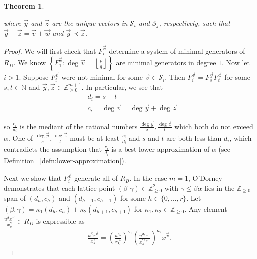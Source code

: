 \documentclass{amsart}
\theoremstyle{plain}
\newtheorem{thm}{Theorem}[section]
\theoremstyle{definition}
\theoremstyle{remark}
\numberwithin{equation}{section}
\newcommand\bn{{\mathbb N}}
\newcommand\bz{{\mathbb Z}}
\newcommand\mss{\mathscr{S}}
\begin{document}
\begin{thm}
\begin{enumerate}
\end{enumerate}

\noindent
where $\vec{y}$ and $\vec{z}$ are the unique
vectors in $\mss_i$ and $\mss_j$, respectively, such that $\vec{y}
+ \vec{z} = \vec{v} + \vec{w}$ and $\vec{y} \prec \vec{z}$.
\end{thm}
\begin{proof}
We will first check that $F^{\vec v}_i$ determine a system of minimal
generators of $R_D$. We know $\left\{F_{1}^{\vec{v}} : \deg \vec{v} =
\left\lfloor
\frac{p}{q} \right\rfloor \right\}$ are minimal generators in
degree $1$. Now let $i > 1$. Suppose $F_i^{\vec{v}}$ were not
minimal for some $\vec{v} \in \mss_i$. Then $F_i^{\vec{v}} =
F_{s}^{\vec{y}} F_{t}^{\vec{z}}$ for some $s, t \in \bn$ and
$\vec{y}, \vec{z} \in \bz_{ \geq 0}^{m + 1}$. In particular, we see
that 
\begin{align*}
	&d_i = s + t \\
	&c_i = \deg \vec{v} = \deg \vec{y} + \deg \vec{z}
\end{align*}

\noindent
so $\frac{c_i}{d_i}$ is the mediant of the rational numbers
$\frac{\deg \vec{y}}{s}, \frac{\deg \vec{z}}{t}$ which both
do not exceed $\alpha$. One of $\frac{\deg \vec{y}}{s},
\frac{\deg \vec{z}}{t}$ must be at least $\frac{c_i}{d_i}$
and $s$ and $t$ are both less than $d_i$, which contradicts the assumption that
$\frac{c_i}{d_i}$ is a best lower approximation of $\alpha$
(see Definition ~\ref{defn:lower-approximation}).

Next we show that $F^{\vec v}_i$ generate all of $R_D$. In the case $m = 1$, O'Dorney \cite[Theorem 6]
{dorney:canonical} demonstrates that each lattice point $(\beta, \gamma) \in
\bz_{\geq 0}^2$ with $\gamma \leq \beta \alpha$ lies in the $\bz_{\geq 0}$ span
of $(d_h, c_h)$ and $(d_{h + 1}, c_{h + 1})$ for
some $h \in \{0, \ldots, r\}$. Let $(\beta, \gamma) = \kappa_1
(d_h, c_h) + \kappa_2 (d_{h + 1}, c_{h + 1})$ for $\kappa_1, \kappa_2 \in
\bz_{\geq 0}$. Any element $\frac{u^{\beta}
x^{\vec{v}}} {x_k^{ \gamma}} \in R_D$ is expressible as
\begin{align*}
	\frac{u^{\beta} x^{\vec{v}}} {x_k^{\gamma}} = \left(\frac{u^{d_h}}
	{x_k^{c_h}}\right)^{\kappa_1} \left(\frac{u^{d_{h + 1}}}
	{x_k^{c_{h + 1}}}\right)^{\kappa_2} x^{\vec{v}}.
\end{align*}


\end{proof}
\end{document}
